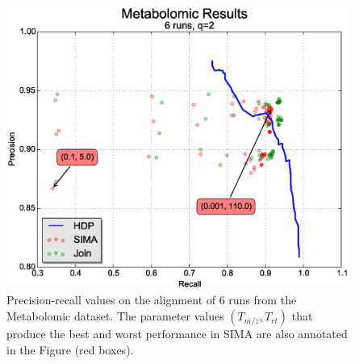 \begin{figure}
\centering\includegraphics[width=1\columnwidth]{05-hdp/figures/figure_6.eps}
\centering\caption{\label{fig:metabolomic_results_alignment}Precision-recall values on the alignment of 6 runs from the Metabolomic dataset. The parameter values $(T_{m/z}, T_{rt})$ that produce the best and worst performance in SIMA are also annotated in the Figure (red boxes).}
\end{figure}

